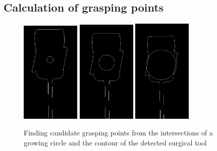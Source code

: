 \subsection{Calculation of grasping points}

\begin{center}
\begin{figure}[H]
\centering
\includegraphics[width=0.25\textwidth]{images/grasp_points_1.png}
\includegraphics[width=0.25\textwidth]{images/grasp_points_2.png}
\includegraphics[width=0.25\textwidth]{images/grasp_points_3.png}\\
\caption{Finding candidate grasping points from the intersections of a growing circle and the contour of the detected surgical tool}
\end{figure}
\end{center}

